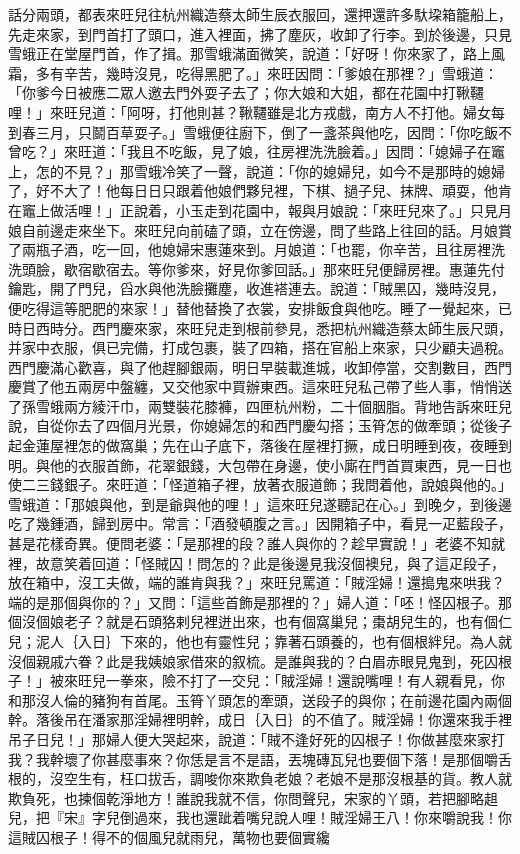 話分兩頭，都表來旺兒往杭州織造蔡太師生辰衣服回，還押還許多馱垜箱籠船上，先走來家，到門首打了頭口，進入裡面，拂了塵灰，收卸了行李。到於後邊，只見雪蛾正在堂屋門首，作了揖。那雪蛾滿面微笑，說道：「好呀！你來家了，路上風霜，多有辛苦，幾時沒見，吃得黑肥了。」來旺因問：「爹娘在那裡？」雪蛾道：「你爹今日被應二眾人邀去門外耍子去了；你大娘和大姐，都在花園中打鞦韆哩！」來旺兒道：「阿呀，打他則甚？鞦韆雖是北方戎戲，南方人不打他。婦女每到春三月，只鬬百草耍子。」雪蛾便往廚下，倒了一盞茶與他吃，因問：「你吃飯不曾吃？」來旺道：「我且不吃飯，見了娘，往房裡洗洗臉着。」因問：「媳婦子在竈上，怎的不見？」那雪蛾冷笑了一聲，說道：「你的媳婦兒，如今不是那時的媳婦了，好不大了！他每日日只跟着他娘們夥兒裡，下棋、撾子兒、抹牌、頑耍，他肯在竈上做活哩！」正說着，小玉走到花園中，報與月娘說：「來旺兒來了。」只見月娘自前邊走來坐下。來旺兒向前磕了頭，立在傍邊，問了些路上往回的話。月娘賞了兩瓶子酒，吃一回，他媳婦宋惠蓮來到。月娘道：「也罷，你辛苦，且往房裡洗洗頭臉，歇宿歇宿去。等你爹來，好見你爹回話。」那來旺兒便歸房裡。惠蓮先付鑰匙，開了門兒，舀水與他洗臉攤塵，收進褡連去。說道：「賊黑囚，幾時沒見，便吃得這等肥肥的來家！」替他替換了衣裳，安排飯食與他吃。睡了一覺起來，已時日西時分。西門慶來家，來旺兒走到根前參見，悉把杭州織造蔡太師生辰尺頭，并家中衣服，俱已完備，打成包裹，裝了四箱，搭在官船上來家，只少顧夫過稅。西門慶滿心歡喜，與了他趕腳銀兩，明日早裝載進城，收卸停當，交割數目，西門慶賞了他五兩房中盤纏，又交他家中買辦東西。這來旺兒私己帶了些人事，悄悄送了孫雪蛾兩方綾汗巾，兩雙裝花膝褲，四匣杭州粉，二十個胭脂。背地告訴來旺兒說，自從你去了四個月光景，你媳婦怎的和西門慶勾搭；玉筲怎的做牽頭；從後子起金蓮屋裡怎的做窩巢；先在山子底下，落後在屋裡打撅，成日明睡到夜，夜睡到明。與他的衣服首飾，花翠銀錢，大包帶在身邊，使小廝在門首買東西，見一日也使二三錢銀子。來旺道：「怪道箱子裡，放著衣服道飾；我問着他，說娘與他的。」雪蛾道：「那娘與他，到是爺與他的哩！」這來旺兒遂聽記在心。」到晚夕，到後邊吃了幾鍾酒，歸到房中。常言：「酒發頓腹之言。」因開箱子中，看見一疋藍段子，甚是花樣奇異。便問老婆：「是那裡的段？誰人與你的？趁早實說！」老婆不知就裡，故意笑着回道：「怪賊囚！問怎的？此是後邊見我沒個襖兒，與了這疋段子，放在箱中，沒工夫做，端的誰肯與我？」來旺兒罵道：「賊淫婦！還搗鬼來哄我？端的是那個與你的？」又問：「這些首飾是那裡的？」婦人道：「呸！怪囚根子。那個沒個娘老子？就是石頭狢剌兒裡迸出來，也有個窩巢兒；棗胡兒生的，也有個仁兒；泥人｛入日｝下來的，他也有靈性兒；靠著石頭養的，也有個根絆兒。為人就沒個親戚六眷？此是我姨娘家借來的叙梳。是誰與我的？白眉赤眼見鬼到，死囚根子！」被來旺兒一拳來，險不打了一交兒：「賊淫婦！還說嘴哩！有人親看見，你和那沒人倫的豬狗有首尾。玉筲丫頭怎的牽頭，送段子的與你；在前邊花園內兩個幹。落後吊在潘家那淫婦裡明幹，成日｛入日｝的不值了。賊淫婦！你還來我手裡吊子日兒！」那婦人便大哭起來，說道：「賊不逢好死的囚根子！你做甚麼來家打我？我幹壞了你甚麼事來？你恁是言不是語，丟塊磚瓦兒也要個下落！是那個嚼舌根的，沒空生有，枉口拔舌，調唆你來欺負老娘？老娘不是那沒根基的貨。教人就欺負死，也揀個乾淨地方！誰說我就不信，你問聲兒，宋家的丫頭，若把腳略趄兒，把『宋』字兒倒過來，我也還跐着嘴兒說人哩！賊淫婦王八！你來嚼說我！你這賊囚根子！得不的個風兒就雨兒，萬物也要個實纔